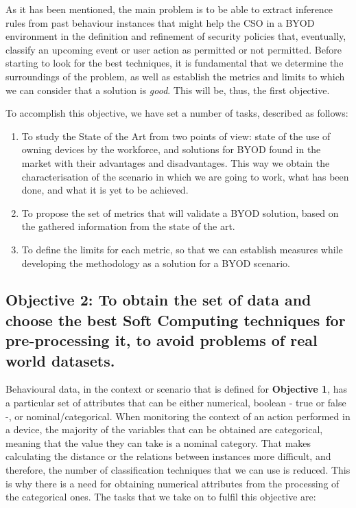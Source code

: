 As it has been mentioned, the main problem %
is to be able to extract inference rules from past behaviour instances that might help the CSO in a BYOD environment in the definition and refinement of security policies that, eventually, classify an upcoming event or user action as permitted or not permitted. Before starting to look for the best techniques, it is fundamental that we determine the surroundings of the problem, as well as establish the metrics and limits to which we can consider that a solution is \textit{good}. This will be, thus, the first objective. 

To accomplish this objective, we have set a number of tasks, described as follows:

\begin{enumerate}
	\item To study the State of the Art from two points of view: state of the use of owning devices by the workforce, and solutions for BYOD found in the market with their advantages and disadvantages. This way we obtain the characterisation of the scenario in which we are going to work, what has been done, and what it is yet to be achieved.
	\item To propose the set of metrics that will validate a BYOD solution, based on the gathered information from the state of the art.
	\item To define the limits for each metric, so that we can establish measures while developing the methodology as a solution for a BYOD scenario.
\end{enumerate}


\newcommand{\objectivedata}{To obtain the set of data and choose the best Soft Computing techniques for pre-processing it, to avoid problems of real world datasets.}

\subsection*{Objective 2: \objectivedata} 
\label{subsec:intro:obj:methodology}

Behavioural data, in the context or scenario that is defined for \textbf{Objective 1}, has a particular set of attributes that can be either numerical, boolean - true or false -, or nominal/categorical. When monitoring the context of an action performed in a device, the majority of the variables that can be obtained are categorical, meaning that the value they can take is a nominal category. That makes calculating the distance or the relations between instances more difficult, and therefore, the number of classification techniques that we can use is reduced. This is why there is a need for obtaining numerical attributes from the processing of the categorical ones. The tasks that we take on to fulfil this objective are:

